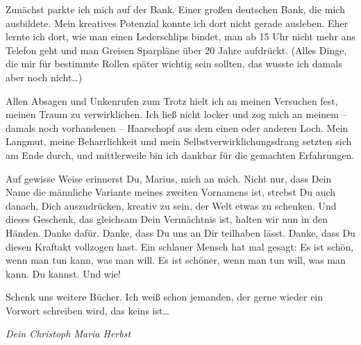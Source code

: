 \documentclass[fontsize=14pt,a4paper,headinclude,DIV=calc,automark]{scrbook}
\begin{document}
Zunächst parkte ich mich auf der Bank. Einer großen deutschen Bank, die mich ausbildete. Mein kreatives Potenzial konnte ich dort nicht gerade ausleben. Eher lernte ich dort, wie man einen Lederschlips bindet, man ab 15 Uhr nicht mehr ans Telefon geht und man Greisen Sparpläne über 20 Jahre aufdrückt. (Alles Dinge, die mir für bestimmte Rollen später wichtig sein sollten, das wusste ich damals aber noch nicht…)

Allen Absagen und Unkenrufen zum Trotz hielt ich an meinen Versuchen fest, meinen Traum zu verwirklichen.
Ich ließ nicht locker und zog mich an meinem – damals noch vorhandenen – Haarschopf aus dem einen oder anderen Loch. Mein Langmut, meine Beharrlichkeit und mein Selbstverwirklichungsdrang setzten sich am Ende durch, und mittlerweile bin ich dankbar für die gemachten Erfahrungen.

Auf gewisse Weise erinnerst Du, Marius, mich an mich. Nicht nur, dass Dein Name die männliche Variante meines zweiten Vornamens ist, strebst Du auch danach, Dich auszudrücken, kreativ zu sein, der Welt etwas zu schenken. Und dieses Geschenk, das gleichsam Dein Vermächtnis ist, halten wir nun in den Händen.
Danke dafür. Danke, dass Du uns an Dir teilhaben lässt. Danke, dass Du diesen Kraftakt vollzogen hast.
Ein schlauer Mensch hat mal gesagt: Es ist schön, wenn man tun kann, was man will. Es ist schöner, wenn man tun will, was man kann.
Du kannst. Und wie!

Schenk uns weitere Bücher. Ich weiß schon jemanden, der gerne wieder ein Vorwort schreiben wird, das keins ist…

\vspace{0.5cm}
\noindent\textit{Dein Christoph Maria Herbst}
\end{document}
